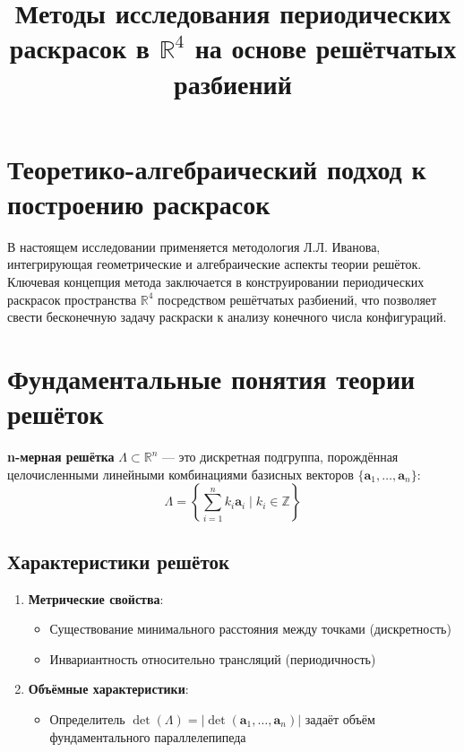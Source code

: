 \documentclass[12pt]{article}
\begin{document}
\title{Методы исследования периодических раскрасок в $\mathbb{R}^4$ на основе решётчатых разбиений}




\maketitle

\section{Теоретико-алгебраический подход к построению раскрасок}

В настоящем исследовании применяется методология Л.Л. Иванова, интегрирующая геометрические и алгебраические аспекты теории решёток. Ключевая концепция метода заключается в конструировании периодических раскрасок пространства $\mathbb{R}^4$ посредством решётчатых разбиений, что позволяет свести бесконечную задачу раскраски к анализу конечного числа конфигураций.

\section{Фундаментальные понятия теории решёток}

\begin{definition}
\textbf{n-мерная решётка} $\Lambda\subset\mathbb{R}^n$ — это дискретная подгруппа, порождённая целочисленными линейными комбинациями базисных векторов $\{\mathbf{a}_1,\ldots,\mathbf{a}_n\}$:
\begin{equation}
\Lambda = \left\{\sum_{i=1}^n k_i\mathbf{a}_i \mid k_i\in\mathbb{Z}\right\}
\end{equation}
\end{definition}

\subsection{Характеристики решёток}
\begin{enumerate}
\item \textbf{Метрические свойства}:
\begin{itemize}
\item Существование минимального расстояния между точками (дискретность)
\item Инвариантность относительно трансляций (периодичность)
\end{itemize}

\item \textbf{Объёмные характеристики}:
\begin{itemize}
\item Определитель $\det(\Lambda) = |\det(\mathbf{a}_1,\ldots,\mathbf{a}_n)|$ задаёт объём фундаментального параллелепипеда
\end{itemize}
\end{enumerate}
\end{document}
